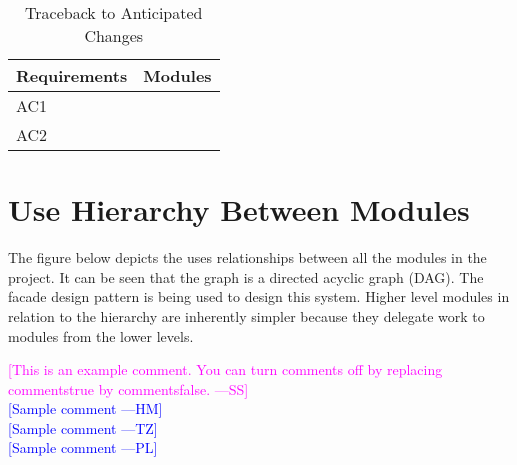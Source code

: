 \documentclass[titlepage]{article}
\newcommand{\authornote}[3]{\textcolor{#1}{[#3 ---#2]}}
\newcommand{\authornote}[3]{}
\newcommand{\wss}[1]{\authornote{magenta}{SS}{#1}}
\newcommand{\hm}[1]{\authornote{blue}{HM}{#1}} %
\newcommand{\tz}[1]{\authornote{blue}{TZ}{#1}} %
\newcommand{\pl}[1]{\authornote{blue}{PL}{#1}} %
\begin{document}
\begin{table}[h!]
\centering
    \begin{tabular}{| p{5cm} | p{5cm} |}    \hline
    Requirements &Modules\\ \hline
    
      AC1  & \\ \hline
      AC2  & \\ \hline
      
    \end{tabular}
    \caption{Traceback to Anticipated Changes}
\label{table:Traceback to Anticipated Changes}
\end{table}


\section{Use Hierarchy Between Modules}
The figure below depicts the uses relationships between all the modules in the project. It can be seen that the graph is a directed acyclic graph (DAG). The facade design pattern is being used to design this system. Higher level modules in relation to the hierarchy are inherently simpler because they delegate work to  modules from the lower levels.



\noindent \wss{This is an example comment.  You can turn comments off by replacing
  commentstrue by commentsfalse.}\\
\hm{Sample comment}\\
\tz{Sample comment}\\
\pl{Sample comment}
\end{document}
